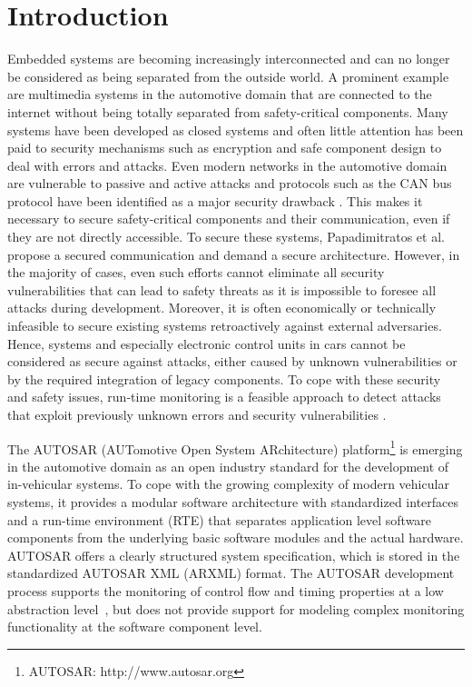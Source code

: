 \section{Introduction}\label{sec:introduction}

Embedded systems are becoming increasingly interconnected and can no longer be considered as being separated from the outside world. 
A prominent example are multimedia systems in the automotive domain that are connected to the internet without being totally separated from safety-critical components.
Many systems have been developed as closed systems and often little attention has been paid to security mechanisms such as encryption and safe component design to deal with errors and attacks. 
Even modern networks in the automotive domain are vulnerable to passive and active attacks \cite{Groll2009} and protocols such as the CAN bus protocol have been identified as a major security drawback \cite{Koscher2010}.
This makes it necessary to secure safety-critical components and their communication, even if they are not directly accessible. 
To secure these systems, Papadimitratos et al. \cite{Papadimitratos2008} propose a secured communication and demand a secure architecture.
However, in the majority of cases, even such efforts cannot eliminate all security vulnerabilities that can lead to safety threats as it is impossible to foresee all attacks during development. 
Moreover, it is often economically or technically infeasible to secure existing systems retroactively against external adversaries.
Hence, systems and especially electronic control units in cars cannot be considered as secure against attacks, either caused by unknown vulnerabilities or by the required integration of legacy components. 
To cope with these security and safety issues, run-time monitoring is a feasible approach to detect attacks that exploit previously unknown errors and security vulnerabilities \cite{Kumar1995}.

The AUTOSAR (AUTomotive Open System ARchitecture) platform\footnote{AUTOSAR: http://www.autosar.org} is emerging in the automotive domain as an open industry standard for the development of in-vehicular systems.
To cope with the growing complexity of modern vehicular systems, it provides a modular software architecture with standardized interfaces and a run-time environment (RTE) that separates application level software components from the underlying basic software modules and the actual hardware.  
AUTOSAR offers a clearly structured system specification, which is stored in the standardized AUTOSAR XML (ARXML) format. 
The AUTOSAR development process supports the monitoring of control flow and timing properties at a low abstraction level~\cite{AUTOSAR_OS_SPEC,AUTOSAR_WDM_SPEC}, but does not provide support for modeling complex monitoring functionality at the software component level.

